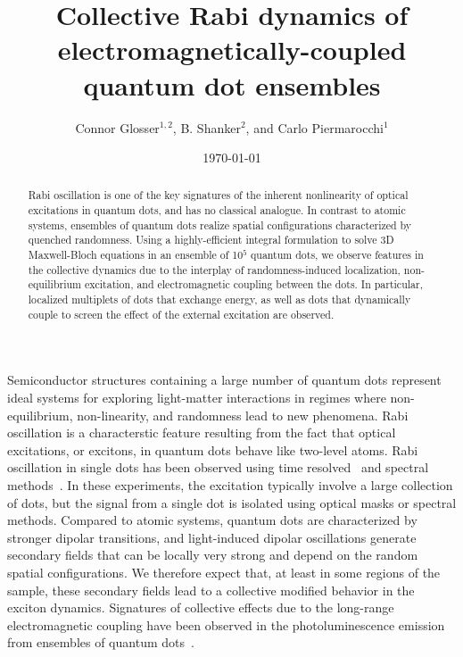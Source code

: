 \documentclass[twocolumn,aps,prl,showpacs]{revtex4-1}
\begin{document}
\title{Collective Rabi dynamics of electromagnetically-coupled quantum dot ensembles}

\author{Connor Glosser$^{1,2}$, B. Shanker$^2$, and Carlo
Piermarocchi$^1$} 


\date{\today}

\begin{abstract}
Rabi oscillation is one of the key signatures of the inherent nonlinearity of optical excitations in quantum dots, and has no classical analogue. In contrast to atomic systems, ensembles of quantum dots realize spatial configurations characterized by quenched randomness. Using a highly-efficient integral formulation to solve 3D Maxwell-Bloch equations in an ensemble of 10$^5$ quantum dots, we observe features in the collective dynamics due to the interplay of  randomness-induced localization, non-equilibrium excitation, and electromagnetic coupling between the dots. In particular, localized multiplets of dots that exchange energy, as well as dots that dynamically couple to screen the effect of the external excitation are observed.
\end{abstract}

\maketitle 
 Semiconductor structures containing a large number of quantum dots represent ideal systems for exploring light-matter interactions in regimes where non-equilibrium, non-linearity, and randomness lead to new phenomena. Rabi oscillation is a characterstic feature resulting from the fact that optical excitations, or excitons, in  quantum dots behave like two-level atoms. Rabi oscillation in single  dots has been observed using time resolved~\cite{stievater, shih} and spectral methods~\cite{kamada}.  In these experiments,  the excitation typically involve a large collection of dots, but the signal from a single dot is isolated using optical masks or spectral methods. Compared to atomic systems, quantum dots are characterized by stronger dipolar transitions, and light-induced dipolar oscillations generate secondary fields that can be locally very strong and depend on the random spatial configurations. We therefore expect that, at least in some regions of the  sample, these secondary fields lead to a collective modified behavior in the exciton dynamics.  Signatures of collective effects due to the long-range electromagnetic coupling have been observed in the photoluminescence emission from ensembles of quantum dots~\cite{forchel}. 
\end{document}
